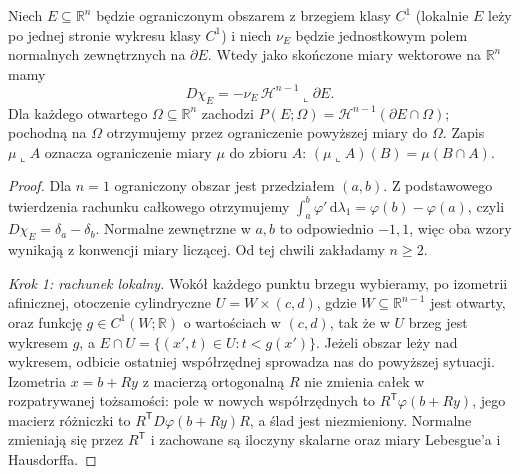 \begin{twierdzenie}
\label{thm:smooth-perimeter-29}
Niech $E\subseteq\mathbb R^n$ będzie ograniczonym
obszarem z brzegiem klasy $C^1$ (lokalnie $E$ leży
po jednej stronie wykresu klasy $C^1$) i niech
$\nu_E$ będzie jednostkowym polem normalnych
zewnętrznych na $\partial E$. Wtedy jako skończone
miary wektorowe na $\mathbb R^n$ mamy
\[
 D\chi_E=-\nu_E\,\mathcal H^{n-1}\llcorner\partial E.
\]
Dla każdego otwartego $\Omega\subseteq\mathbb R^n$
zachodzi $P(E;\Omega)=\mathcal H^{n-1}(\partial E\cap\Omega)$;
pochodną na $\Omega$ otrzymujemy przez ograniczenie
powyższej miary do $\Omega$.
Zapis $\mu\llcorner A$ oznacza ograniczenie miary
$\mu$ do zbioru $A$: $(\mu\llcorner A)(B)=\mu(B\cap A)$.
\end{twierdzenie}
\begin{proof}
Dla $n=1$ ograniczony obszar jest przedziałem
$(a,b)$. Z podstawowego twierdzenia rachunku całkowego
otrzymujemy $\int_a^b\varphi'\,\mathrm d\lambda_1
=\varphi(b)-\varphi(a)$, czyli $D\chi_E=\delta_a-\delta_b$.
Normalne zewnętrzne w $a,b$ to odpowiednio $-1,1$,
więc oba wzory wynikają z konwencji miary liczącej.
Od tej chwili zakładamy $n\ge2$.

\emph{Krok 1: rachunek lokalny.}
Wokół każdego punktu brzegu wybieramy, po izometrii
afinicznej, otoczenie cylindryczne $U=W\times(c,d)$,
gdzie $W\subseteq\mathbb R^{n-1}$ jest otwarty,
oraz funkcję $g\in C^1(W;\mathbb R)$ o wartościach
w $(c,d)$, tak że w $U$ brzeg jest wykresem $g$,
a $E\cap U=\{(x',t)\in U:t<g(x')\}$.
Jeżeli obszar leży nad wykresem, odbicie ostatniej
współrzędnej sprowadza nas do powyższej sytuacji.
Izometria $x=b+Ry$ z macierzą ortogonalną $R$
nie zmienia całek w rozpatrywanej tożsamości:
pole w nowych współrzędnych to
$R^{\mathsf T}\varphi(b+Ry)$, jego macierz różniczki
to $R^{\mathsf T}D\varphi(b+Ry)R$, a ślad jest
niezmieniony. Normalne zmieniają się przez
$R^{\mathsf T}$ i zachowane są iloczyny skalarne
oraz miary Lebesgue'a i Hausdorffa.


\end{proof}

